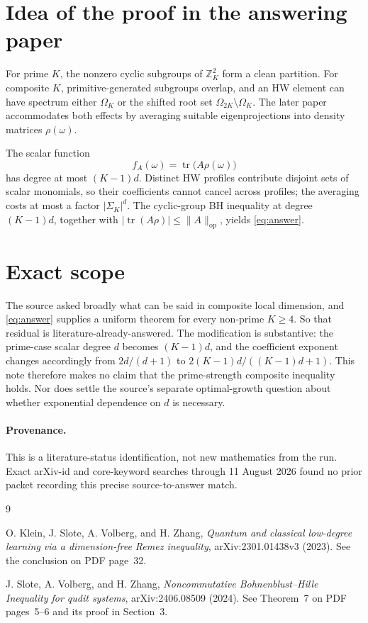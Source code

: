 \documentclass[11pt]{article}
\newcommand{\Z}{\mathbb Z}
\newcommand{\op}{\mathrm{op}}
\begin{document}
\section*{Idea of the proof in the answering paper}
For prime \(K\), the nonzero cyclic subgroups of \(\Z_K^2\) form a clean
partition.  For composite \(K\), primitive-generated subgroups overlap, and an
HW element can have spectrum either \(\Omega_K\) or the shifted root set
\(\Omega_{2K}\setminus\Omega_K\).  The later paper accommodates both effects
by averaging suitable eigenprojections into density matrices \(\rho(\omega)\).

The scalar function
\[
 f_A(\omega)=\operatorname{tr}\!\bigl(A\rho(\omega)\bigr)
\]
has degree at most \((K-1)d\).  Distinct HW profiles contribute disjoint sets
of scalar monomials, so their coefficients cannot cancel across profiles; the
averaging costs at most a factor \(|\Sigma_K|^d\).  The cyclic-group BH
inequality at degree \((K-1)d\), together with
\(|\operatorname{tr}(A\rho)|\le\|A\|_{\op}\), yields \eqref{eq:answer}.

\section*{Exact scope}
The source asked broadly what can be said in composite local dimension, and
\eqref{eq:answer} supplies a uniform theorem for every non-prime \(K\ge4\).
So that residual is literature-already-answered.  The modification is
substantive: the prime-case scalar degree \(d\) becomes \((K-1)d\), and the
coefficient exponent changes accordingly from \(2d/(d+1)\) to
\(2(K-1)d/((K-1)d+1)\).  This note therefore makes no claim that the
prime-strength composite inequality holds.  Nor does \cite{answer} settle the
source's separate optimal-growth question about whether exponential dependence
on \(d\) is necessary.

\paragraph{Provenance.}
This is a literature-status identification, not new mathematics from the run.
Exact arXiv-id and core-keyword searches through 11 August 2026 found no prior
packet recording this precise source-to-answer match.

\begin{thebibliography}{9}
\raggedright
{}
O. Klein, J. Slote, A. Volberg, and H. Zhang,
\emph{Quantum and classical low-degree learning via a dimension-free Remez
inequality}, arXiv:2301.01438v3 (2023).  See the conclusion on PDF page~32.

J. Slote, A. Volberg, and H. Zhang,
\emph{Noncommutative Bohnenblust--Hille Inequality for qudit systems},
arXiv:2406.08509 (2024).  See Theorem~7 on PDF pages~5--6 and its proof in
Section~3.
\end{thebibliography}
\end{document}
